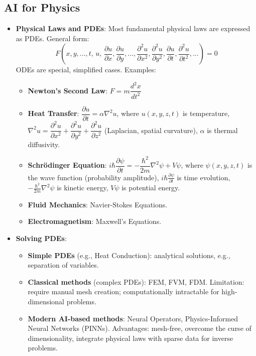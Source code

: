 \documentclass[UTF8]{ctexart}
\begin{document}
\subsection{AI for Physics}
\begin{itemize}
    \item \textbf{Physical Laws and PDEs}: Most fundamental physical laws are expressed as PDEs. General form:
    \[
        F\!\left(x,y,\ldots,t,\,u,\,\frac{\partial u}{\partial x},\frac{\partial u}{\partial y},\ldots,\frac{\partial^2 u}{\partial x^2},\frac{\partial^2 u}{\partial y^2},\frac{\partial u}{\partial t},\frac{\partial^2 u}{\partial t^2},\ldots\right)=0
    \]
    ODEs are special, simplified cases. Examples:
    \begin{itemize}
        \item \textbf{Newton's Second Law}: $F = m\dfrac{d^2x}{dt^2}$
        \item \textbf{Heat Transfer}: $\dfrac{\partial u}{\partial t} = \alpha \nabla^2 u$, where $u(x,y,z,t)$ is temperature, $\nabla^2 u = \dfrac{\partial^2 u}{\partial x^2}+\dfrac{\partial^2 u}{\partial y^2}+\dfrac{\partial^2 u}{\partial z^2}$ (Laplacian, spatial curvature), $\alpha$ is thermal diffusivity.
        \item \textbf{Schr\"{o}dinger Equation}: $i\hbar\dfrac{\partial\psi}{\partial t} = -\dfrac{\hbar^2}{2m}\nabla^2\psi + V\psi$, where $\psi(x,y,z,t)$ is the wave function (probability amplitude), $i\hbar\frac{\partial\psi}{\partial t}$ is time evolution, $-\frac{\hbar^2}{2m}\nabla^2\psi$ is kinetic energy, $V\psi$ is potential energy.
        \item \textbf{Fluid Mechanics}: Navier-Stokes Equations.
        \item \textbf{Electromagnetism}: Maxwell's Equations.
    \end{itemize}

    \item \textbf{Solving PDEs}:
    \begin{itemize}
        \item \textbf{Simple PDEs} (e.g., Heat Conduction): analytical solutions, e.g., separation of variables.
        \item \textbf{Classical methods} (complex PDEs): FEM, FVM, FDM. Limitation: require manual mesh creation; computationally intractable for high-dimensional problems.
        \item \textbf{Modern AI-based methods}: Neural Operators, Physics-Informed Neural Networks (PINNs). Advantages: mesh-free, overcome the curse of dimensionality, integrate physical laws with sparse data for inverse problems.
    \end{itemize}


\end{itemize}
\end{document}
